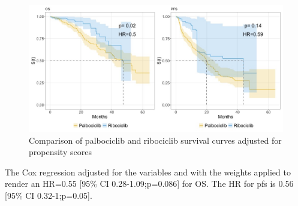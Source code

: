 \begin{figure}[ht]
  \centering

  \caption{Comparison of palbociclib and ribociclib survival curves adjusted for propensity scores}\label{fig:propensity} 
  \includegraphics[scale=0.42]{figures/propensity_score_both.jpeg}%

\end{figure}

The Cox regression adjusted for the variables and with the weights applied to render an HR=0.55 [95\% CI 0.28-1.09;p=0.086] for OS. The HR for \ac{pfs} is 0.56 [95\% CI 0.32-1;p=0.05].